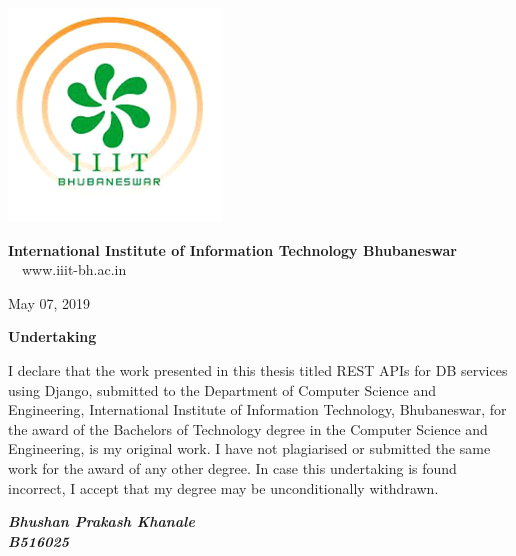 \thispagestyle{empty}
\begin{minipage}{.1\linewidth}
\hspace*{-1.8cm}
\vspace*{-1.8cm}
\includegraphics[scale=0.65]{ch0/IIITlogo.png}

\end{minipage}
\hspace{.2cm}
\begin{minipage}{.9\linewidth}
{\Large
\textbf{International Institute of Information Technology Bhubaneswar\\}}
{\large
{}}
\textmd{$\quad$www.iiit-bh.ac.in}
\end{minipage}

\vspace{.35in}
%
\fontsize{12}{14}
\selectfont
\begin{flushright}
May 07, 2019
\end{flushright}
\vspace{1.0in}

\centerline{\Large{\bf Undertaking}}
\vspace{1cm}
\noindent
I declare that the work presented in this thesis titled
REST APIs for DB services using Django, submitted to the Department of
Computer Science and Engineering, International Institute of Information
Technology, Bhubaneswar, for the award of the Bachelors of Technology degree
in the Computer Science and Engineering, is my original work. I have not
plagiarised or submitted the same work for the award of any other degree.
In case this undertaking is found incorrect, I accept that my degree may be
unconditionally withdrawn.
\vspace*{0.5in}

\begin{flushright}
\textbf{\textit{Bhushan Prakash Khanale}} \\
\textbf{\textit{B516025}}
\end{flushright}
